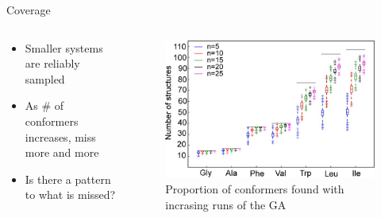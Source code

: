 \documentclass[10pt]{beamer}
\begin{document}
{{%
\begin{frame}{Coverage}
	\begin{columns}[c] %
		\begin{column}{.4\textwidth}
			\begin{itemize}
				\item {Smaller systems are reliably sampled}
				\item {As \# of conformers increases, miss more and more}
				\item {Is there a pattern to what is missed?}
			\end{itemize}
		\end{column}
		\hfill
		\begin{column}{0.6\textwidth}
			\begin{figure}
				\includegraphics[width=\linewidth]{images/Supady4.png}
				\caption*{Proportion of conformers found with incrasing runs of the GA}
			\end{figure}
		\end{column}
	\end{columns}
\end{frame}
}

}
\end{document}
